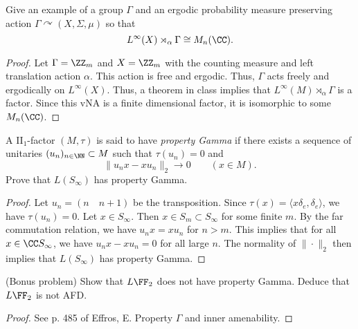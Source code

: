 \documentclass{article}
\begin{document}
 Give an example of a group $\Gamma$ and an ergodic probability measure preserving action $\Gamma \curvearrowright (X, \Sigma, \mu)$ so that
$$L^\infty(X) \rtimes_\alpha \Gamma \cong M_n(\CC).$$
\begin{proof}
  Let $\Gamma = \ZZ_m$ and $X = \ZZ_m$ with the counting measure and left translation action $\alpha$.  This action is free and ergodic.  Thus, $\Gamma$ acts freely and ergodically on $L^\infty(X)$.  Thus, a theorem in class implies that $L^\infty(M) \rtimes_\alpha \Gamma$ is a factor.  Since this vNA is a finite dimensional factor, it is isomorphic to some $M_n(\CC)$.
\end{proof}


 A II$_1$-factor $(M, \tau)$ is said to have \emph{property Gamma} if there exists a sequence of unitaries $(u_n)_{n \in \NN} \subset M$ such that $\tau(u_n) = 0$ and
$$ \| u_nx - xu_n \|_2 \to 0 \qquad (x \in M).$$
Prove that $L(S_\infty)$ has property Gamma.
\begin{proof}
  Let $u_n = (n \quad n+1)$ be the transposition. Since $\tau(x) = \langle x \delta_e, \delta_e \rangle$, we have $\tau(u_n) = 0$.  Let $x \in S_\infty$.  Then $x \in S_m \subset S_\infty$ for some finite $m$.  By the far commutation relation, we have $u_n x = x u_n$ for $n > m$.  This implies that for all $x \in \CC S_\infty$, we have $u_n x - x u_n = 0$ for all large $n$.  The normality of $\| \cdot \|_2$ then implies that $L(S_\infty)$ has property Gamma.  
\end{proof}

 (Bonus problem) Show that $L\FF_2$ does not have property Gamma. Deduce that $L \FF_2$ is not AFD.
\begin{proof}
  See p. 485 of Effros, E. Property $\Gamma$ and inner amenability.
\end{proof}
\end{document}
